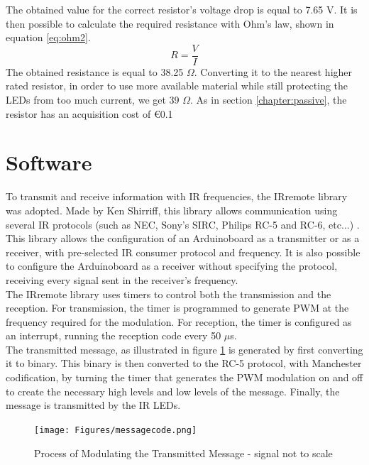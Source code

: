 The obtained value for the correct resistor's voltage drop is equal to 7.65 V. It is then possible to calculate the required resistance with Ohm's law, shown in equation \eqref{eq:ohm2}.
\begin{equation}\label{eq:ohm2}
R=\dfrac{V}{I}
\end{equation}
The obtained resistance is equal to 38.25 $\Omega$. Converting it to the nearest higher rated resistor, in order to use more available material while still protecting the LEDs from too much current, we get 39 $\Omega$. As in section \ref{chapter:passive}, the resistor has an acquisition cost of \euro{0.1}\\

\section{Software}
\label{section:software}

To transmit and receive information with IR frequencies, the IRremote library was adopted. Made by Ken Shirriff, this library allows communication using several IR protocols (such as NEC, Sony's SIRC, Philips RC-5 and RC-6, etc...) \citep{Shirriff2009}.
This library allows the configuration of an Arduino\texttrademark board as a transmitter or as a receiver, with pre-selected IR consumer protocol and frequency. It is also possible to configure the Arduino\texttrademark board as a receiver without specifying the protocol, receiving every signal sent in the receiver's frequency.\\
The IRremote library uses timers to control both the transmission and the reception. For transmission, the timer is programmed to generate PWM at the frequency required for the modulation. For reception, the timer is configured as an interrupt, running the reception code every 50 $\mu$s.\\

The transmitted message, as illustrated in figure \ref{fig:messagecode} is generated by first converting it to binary. This binary is then converted to the RC-5 protocol, with Manchester codification, by turning the timer that generates the PWM modulation on and off to create the necessary high levels and low levels of the message. Finally, the message is transmitted by the IR LEDs.\\
\begin{figure}[!htb]
  \centering
  \texttt{[image: Figures/messagecode.png]}
  \caption[Process of Modulating the Transmitted Message]{Process of Modulating the Transmitted Message - signal not to scale}
  \label{fig:messagecode}
\end{figure}

